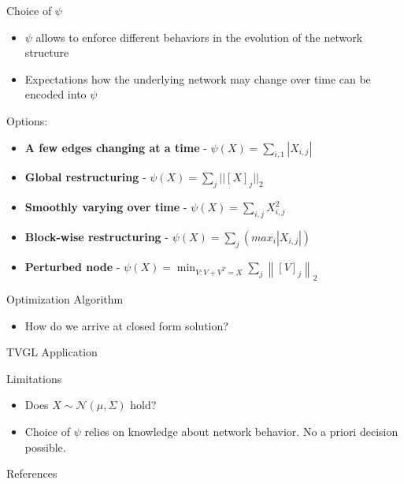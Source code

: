 \documentclass{beamer}
\begin{document}
\begin{frame}{Choice of $\psi$}
    \begin{itemize}
        \item $\psi$ allows to enforce different behaviors in the evolution of the network structure
        \item Expectations how the underlying network may change over time can be encoded into $\psi$
    \end{itemize}
    Options:
    \begin{itemize}
        \item \textbf{A few edges changing at a time} - $\psi(X) = \sum_{i,1}|X_{i,j}|$
        \item \textbf{Global restructuring} - $\psi(X) = \sum_j||[X]_j||_2$
        \item \textbf{Smoothly varying over time} - $\psi(X) = \sum_{i,j}X^2_{i,j}$
        \item \textbf{Block-wise restructuring} - $\psi(X) = \sum_j\left( max_i|X_{i,j}| \right)$
        \item \textbf{Perturbed node} - $\psi(X)=\min _{V: V+V^{T}=X} \sum_{j}\left\|[V]_{j}\right\|_{2}$
    \end{itemize}
\end{frame}

\begin{frame}{Optimization Algorithm}
    \begin{itemize}
        \item How do we arrive at closed form solution?
    \end{itemize}
\end{frame}

\begin{frame}{TVGL Application}
\end{frame}


\begin{frame}{Limitations}
    \begin{itemize}
        \item Does $X \sim \mathcal{N}(\mu, \Sigma)$ hold?
        \item Choice of $\psi$ relies on knowledge about network behavior.
        No a priori decision possible.
    \end{itemize}
\end{frame}

\begin{frame}{References}
    \nocite{*}
    
    
\end{frame}
\end{document}
